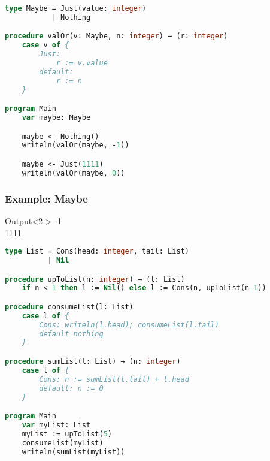 \documentclass{beamer}
\begin{document}
\begin{lrbox}{\exampleMaybe}
\begin{lstlisting}[language=Pascal, basicstyle=\tiny]
type Maybe = Just(value: integer)
           | Nothing

procedure valOr(v: Maybe, n: integer) → (r: integer)
    case v of {
        Just:
            r := v.value
        default:
            r := n
    }

program Main
    var maybe: Maybe

    maybe <- Nothing()
    writeln(valOr(maybe, -1))

    maybe <- Just(1111)
    writeln(valOr(maybe, 0))


\end{lstlisting}
\end{lrbox}

\begin{frame}
\frametitle{Example: Maybe}
\usebox{\exampleMaybe}

\begin{block}{Output}<2->
-1\\
1111
\end{block}
\end{frame}


\begin{lrbox}{\exampleList}
\begin{lstlisting}[language=Pascal, basicstyle=\tiny]
type List = Cons(head: integer, tail: List)
          | Nil

procedure upToList(n: integer) → (l: List)
    if n < 1 then l := Nil() else l := Cons(n, upToList(n-1))

procedure consumeList(l: List)
    case l of {
        Cons: writeln(l.head); consumeList(l.tail)
        default nothing
    }

procedure sumList(l: List) → (n: integer)
    case l of {
        Cons: n := sumList(l.tail) + l.head
        default: n := 0
    }

program Main
    var myList: List
    myList := upToList(5)
    consumeList(myList)
    writeln(sumList(myList))
\end{lstlisting}
\end{lrbox}
\end{document}
